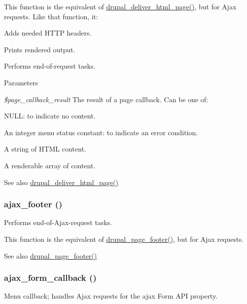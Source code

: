 This function is the equivalent of \hyperlink{common_8inc_a05ab0d6e81d6cbe2a6b9f645b9e710ec}{drupal\_\-deliver\_\-html\_\-page()}, but for Ajax requests. Like that function, it:
\begin{DoxyItemize}
\item Adds needed HTTP headers.
\item Prints rendered output.
\item Performs end-\/of-\/request tasks.
\end{DoxyItemize}


\begin{DoxyParams}{Parameters}
\item[{\em \$page\_\-callback\_\-result}]The result of a page callback. Can be one of:
\begin{DoxyItemize}
\item NULL: to indicate no content.
\item An integer menu status constant: to indicate an error condition.
\item A string of HTML content.
\item A renderable array of content.
\end{DoxyItemize}\end{DoxyParams}
\begin{DoxySeeAlso}{See also}
\hyperlink{common_8inc_a05ab0d6e81d6cbe2a6b9f645b9e710ec}{drupal\_\-deliver\_\-html\_\-page()} 
\end{DoxySeeAlso}
\hypertarget{group__ajax_ga6994db099f28d8e2d51218813e730834}{
\subsubsection[{ajax\_\-footer}]{\setlength{\rightskip}{0pt plus 5cm}ajax\_\-footer ()}}
\label{group__ajax_ga6994db099f28d8e2d51218813e730834}
Performs end-\/of-\/Ajax-\/request tasks.

This function is the equivalent of \hyperlink{common_8inc_a64bc7d539a74e850935d73968788abd3}{drupal\_\-page\_\-footer()}, but for Ajax requests.

\begin{DoxySeeAlso}{See also}
\hyperlink{common_8inc_a64bc7d539a74e850935d73968788abd3}{drupal\_\-page\_\-footer()} 
\end{DoxySeeAlso}
\hypertarget{group__ajax_gabe2739824006df057d291f6be49759ab}{
\subsubsection[{ajax\_\-form\_\-callback}]{\setlength{\rightskip}{0pt plus 5cm}ajax\_\-form\_\-callback ()}}
\label{group__ajax_gabe2739824006df057d291f6be49759ab}
Menu callback; handles Ajax requests for the ajax Form API property.

